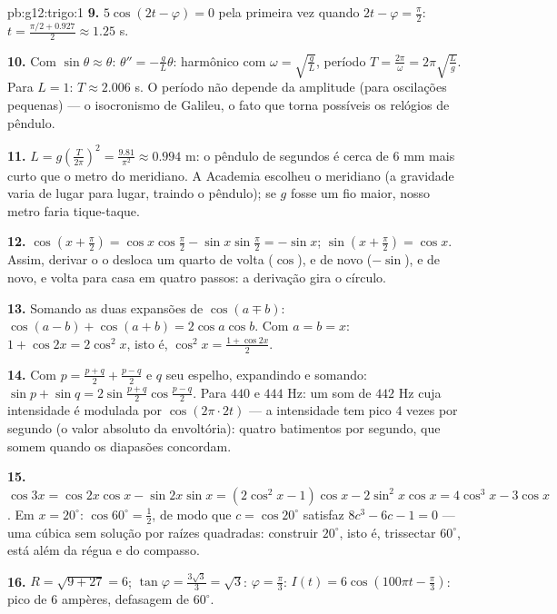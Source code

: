 \begin{solution}{pb:g12:trigo:1}
\textbf{9.} $5\cos(2t - \varphi) = 0$ pela primeira vez quando
$2t - \varphi = \frac\pi2$:
$t = \frac{\pi/2 + 0.927}{2} \approx 1.25$ s.

\textbf{10.} Com $\sin\theta \approx \theta$:
$\theta'' = -\frac gL \theta$: harmônico com
$\omega = \sqrt{\frac gL}$, período
$T = \frac{2\pi}{\omega} = 2\pi\sqrt{\frac Lg}$. Para $L = 1$:
$T \approx 2.006$ s. O período não depende da amplitude (para
oscilações pequenas) --- o isocronismo de Galileu, o fato que
torna possíveis os relógios de pêndulo.

\textbf{11.} $L = g\left(\frac{T}{2\pi}\right)^2 =
\frac{9.81}{\pi^2} \approx 0.994$ m: o pêndulo de segundos é
cerca de $6$ mm mais curto que o metro do meridiano. A Academia
escolheu o meridiano (a gravidade varia de lugar para lugar,
traindo o pêndulo); se $g$ fosse um fio maior, nosso metro
faria tique-taque.

\textbf{12.} $\cos\left(x + \frac\pi2\right) =
\cos x \cos\frac\pi2 - \sin x \sin\frac\pi2 = -\sin x$;
$\sin\left(x + \frac\pi2\right) = \cos x$. Assim, derivar o
 o desloca um quarto de volta ($\cos$), e de novo
($-\sin$), e de novo, e volta para casa em quatro passos: a
derivação gira o círculo.

\textbf{13.} Somando as duas expansões de $\cos(a \mp b)$:
$\cos(a-b) + \cos(a+b) = 2\cos a\cos b$. Com $a = b = x$:
$1 + \cos 2x = 2\cos^2 x$, isto é,
$\cos^2 x = \frac{1 + \cos 2x}{2}$.

\textbf{14.} Com $p = \frac{p+q}{2} + \frac{p-q}{2}$ e $q$ seu
espelho, expandindo e somando:
$\sin p + \sin q = 2\sin\frac{p+q}{2}\cos\frac{p-q}{2}$. Para
$440$ e $444$ Hz: um som de $442$ Hz cuja intensidade é modulada
por $\cos(2\pi \cdot 2t)$ --- a intensidade tem pico $4$ vezes
por segundo (o valor absoluto da envoltória): quatro batimentos
por segundo, que somem quando os diapasões concordam.

\textbf{15.} $\cos 3x = \cos 2x\cos x - \sin 2x \sin x =
(2\cos^2 x - 1)\cos x - 2\sin^2 x\cos x = 4\cos^3 x -
3\cos x$. Em $x = 20^\circ$: $\cos 60^\circ = \frac12$, de modo
que $c = \cos 20^\circ$ satisfaz $8c^3 - 6c - 1 = 0$ --- uma
cúbica sem solução por raízes quadradas: construir $20^\circ$,
isto é, trissectar $60^\circ$, está além da régua e do
compasso.

\textbf{16.} $R = \sqrt{9 + 27} = 6$;
$\tan\varphi = \frac{3\sqrt3}{3} = \sqrt3$:
$\varphi = \frac\pi3$:
$I(t) = 6\cos\left(100\pi t - \frac\pi3\right)$: pico de $6$
ampères, defasagem de $60^\circ$.


\end{solution}
